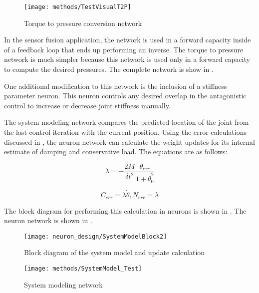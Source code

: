 \begin{figure}[htb!]
\centering
\texttt{[image: methods/TestVisualT2P]}
\caption{Torque to pressure conversion network}
\label{fig:T2PNetwork}
\end{figure}

In the sensor fusion application,
the network is used in a forward capacity inside of a feedback loop that ends
up performing an inverse. The torque to pressure network is much simpler because this network
is used only in a forward capacity to compute the desired pressures. The complete network is show in .

One additional modification to this network is the inclusion of a stiffness
parameter neuron. This neuron controls any desired overlap in the antagonistic control
to increase or decrease joint stiffness manually.


The system modeling network compares the predicted location of the joint from 
the last control iteration with the current position. Using the error 
calculations discussed in , the neuron network
can calculate the weight updates for its internal estimate of damping and 
conservative load. The equations are as follows:

\begin{equation}
\lambda 
=
- \dfrac{2M}{\delta t^{2}} \dfrac{\theta_{err}}{1 + \dot{\theta}_{0}^{2}}
\end{equation}

\begin{equation}
C_{err} = \lambda \dot{\theta}, N_{err} = \lambda
\end{equation}

The block diagram for performing this calculation in neurons is shown in . The neuron network is shown in .

\begin{figure}
\centering
\texttt{[image: neuron\_design/SystemModelBlock2]}
\caption{Block diagram of the system model and update calculation}
\label{fig:SystemModelBlock}
\end{figure}

\begin{figure}
\centering
\texttt{[image: methods/SystemModel\_Test]}
\caption{System modeling network}
\label{fig:SystemModelNetwork}
\end{figure}

